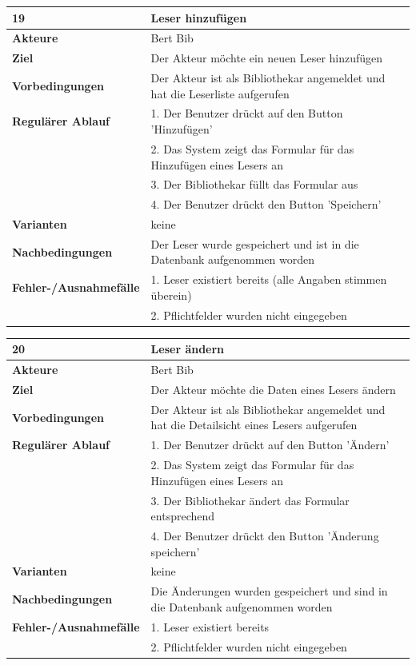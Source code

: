 \documentclass[fontsize=12pt,paper=a4,twoside]{scrartcl}
\begin{document}
\begin{table}[htbp]
\label{19}
\begin{tabular}{|l|p{10cm}|}
\hline 
\textbf{19} & \textbf{Leser hinzufügen} \\ \hline
\textbf{Akteure} & Bert Bib\\ \hline
\textbf{Ziel} & Der Akteur möchte ein neuen Leser hinzufügen \\ \hline
\textbf{Vorbedingungen} & Der Akteur ist als Bibliothekar angemeldet und hat die Leserliste aufgerufen  \\ \hline
\textbf{Regulärer Ablauf} & 
1. Der Benutzer drückt auf den Button 'Hinzufügen' \\
&2. Das System zeigt das Formular für das Hinzufügen eines Lesers an\\
&3. Der Bibliothekar füllt das Formular aus\\
&4. Der Benutzer drückt den Button 'Speichern'\\
\hline
\textbf{Varianten} & 
keine \\ \hline
\textbf{Nachbedingungen} & Der Leser wurde gespeichert und ist in die Datenbank aufgenommen worden\\ \hline
\textbf{Fehler-/Ausnahmefälle} & 1. Leser existiert bereits (alle Angaben stimmen überein)\\
&2. Pflichtfelder wurden nicht eingegeben\\
\hline
\end{tabular}
\end{table}

\begin{table}[htbp]
\label{20}
\begin{tabular}{|l|p{10cm}|}
\hline 
\textbf{20} & \textbf{Leser ändern} \\ \hline
\textbf{Akteure} & Bert Bib\\ \hline
\textbf{Ziel} & Der Akteur möchte die Daten eines Lesers ändern \\ \hline
\textbf{Vorbedingungen} & Der Akteur ist als Bibliothekar angemeldet und hat die Detailsicht eines Lesers aufgerufen  \\ \hline
\textbf{Regulärer Ablauf} & 
1. Der Benutzer drückt auf den Button 'Ändern' \\
&2. Das System zeigt das Formular für das Hinzufügen eines Lesers an\\
&3. Der Bibliothekar ändert das Formular entsprechend\\
&4. Der Benutzer drückt den Button 'Änderung speichern'\\
\hline
\textbf{Varianten} & 
keine \\ \hline
\textbf{Nachbedingungen} & Die Änderungen wurden gespeichert und sind in die Datenbank aufgenommen worden\\ \hline
\textbf{Fehler-/Ausnahmefälle} & 1. Leser existiert bereits\\
&2. Pflichtfelder wurden nicht eingegeben\\
\hline
\end{tabular}
\end{table}
\end{document}
